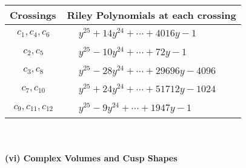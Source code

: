 \documentclass[1p]{elsarticle_modified}
\theoremstyle{definition}
\begin{document}
\begin{tabular}{m{50pt}|m{274pt}}
Crossings & \hspace{64pt}Riley Polynomials at each crossing \\
\hline $$\begin{aligned}c_{1},c_{4},c_{6}\end{aligned}$$&$\begin{aligned}
&y^{25}+14 y^{24}+\cdots+4016 y-1
\end{aligned}$\\
\hline $$\begin{aligned}c_{2},c_{5}\end{aligned}$$&$\begin{aligned}
&y^{25}-10 y^{24}+\cdots+72 y-1
\end{aligned}$\\
\hline $$\begin{aligned}c_{3},c_{8}\end{aligned}$$&$\begin{aligned}
&y^{25}-28 y^{24}+\cdots+29696 y-4096
\end{aligned}$\\
\hline $$\begin{aligned}c_{7},c_{10}\end{aligned}$$&$\begin{aligned}
&y^{25}+24 y^{24}+\cdots+51712 y-1024
\end{aligned}$\\
\hline $$\begin{aligned}c_{9},c_{11},c_{12}\end{aligned}$$&$\begin{aligned}
&y^{25}-9 y^{24}+\cdots+1947 y-1
\end{aligned}$\\
\hline
\end{tabular}\\~\\
\newpage\flushleft \textbf{(vi) Complex Volumes and Cusp Shapes}
\end{document}
